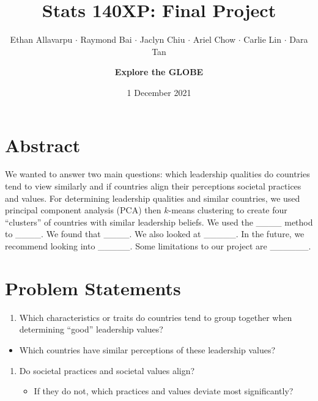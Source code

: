 \documentclass[
]{article}
\title{Stats 140XP: Final Project}
\author{Ethan Allavarpu \(\cdot\) Raymond Bai \(\cdot\) Jaclyn Chiu
\(\cdot\) Ariel Chow \(\cdot\) Carlie Lin \(\cdot\) Dara
Tan \and \textbf{Explore the GLOBE}}
\date{1 December 2021}
\providecommand{\tightlist}{%
  \setlength{\itemsep}{0pt}\setlength{\parskip}{0pt}}
\begin{document}
\maketitle

{
\setcounter{tocdepth}{1}
\tableofcontents
}
\vfill

\newpage

\hypertarget{abstract}{%
\section{Abstract}\label{abstract}}

We wanted to answer two main questions: which leadership qualities do
countries tend to view similarly and if countries align their
perceptions societal practices and values. For determining leadership
qualities and similar countries, we used principal component analysis
(PCA) then \(k\)-means clustering to create four ``clusters'' of
countries with similar leadership beliefs. We used the \_\_\_\_ method
to \_\_\_\_. We found that \_\_\_\_. We also looked at \_\_\_\_\_. In
the future, we recommend looking into \_\_\_\_\_. Some limitations to
our project are \_\_\_\_\_\_.

\hypertarget{problem-statements}{%
\section{Problem Statements}\label{problem-statements}}

\begin{enumerate}
\def\labelenumi{\arabic{enumi}.}
\tightlist
\item
  Which characteristics or traits do countries tend to group together
  when determining ``good'' leadership values?
\end{enumerate}

\begin{itemize}
\tightlist
\item
  Which countries have similar perceptions of these leadership values?
\end{itemize}

\begin{enumerate}
\def\labelenumi{\arabic{enumi}.}
\setcounter{enumi}{1}
\tightlist
\item
  Do societal practices and societal values align?

  \begin{itemize}
  \tightlist
  \item
    If they do not, which practices and values deviate most
    significantly?
  \end{itemize}
\end{enumerate}
\end{document}
